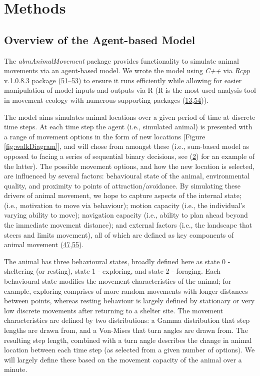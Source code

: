 \documentclass[10pt,a4paper]{article}
\begin{document}
\hypertarget{methods}{%
\section{Methods}\label{methods}}

\hypertarget{overview-of-the-agent-based-model}{%
\subsection{Overview of the Agent-based Model}\label{overview-of-the-agent-based-model}}

The \emph{abmAnimalMovement} package provides functionality to simulate animal movements via an agent-based model.
We wrote the model using \emph{C++} via \emph{Rcpp} v.1.0.8.3 package (\protect\hyperlink{ref-Eddelbuettel_seamless_2011}{51}--\protect\hyperlink{ref-Eddelbuettel_extending_2018}{53}) to ensure it runs efficiently while allowing for easier manipulation of model inputs and outputs via R (R is the most used analysis tool in movement ecology with numerous supporting packages (\protect\hyperlink{ref-joo_recent_2022}{13},\protect\hyperlink{ref-joo_navigating_2020}{54})).

The model aims simulates animal locations over a given period of time at discrete time steps.
At each time step the agent (i.e., simulated animal) is presented with a range of movement options in the form of new locations {[}Figure \ref{fig:walkDiagram}{]}, and will chose from amongst these (i.e., sum-based model as opposed to facing a series of sequential binary decisions, see (\protect\hyperlink{ref-sridhar_geometry_2021}{2}) for an example of the latter).
The possible movement options, and how the new location is selected, are influenced by several factors: behavioural state of the animal, environmental quality, and proximity to points of attraction/avoidance.
By simulating these drivers of animal movement, we hope to capture aspects of the internal state; (i.e., motivation to move via behaviour); motion capacity (i.e., the individual's varying ability to move); navigation capacity (i.e., ability to plan ahead beyond the immediate movement distance); and external factors (i.e., the landscape that steers and limits movement), all of which are defined as key components of animal movement (\protect\hyperlink{ref-Tang2010}{47},\protect\hyperlink{ref-Nathan2008}{55}).

The animal has three behavioural states, broadly defined here as state 0 - sheltering (or resting), state 1 - exploring, and state 2 - foraging.
Each behavioural state modifies the movement characteristics of the animal; for example, exploring comprises of more random movements with longer distances between points, whereas resting behaviour is largely defined by stationary or very low discrete movements after returning to a shelter site.
The movement characteristics are defined by two distributions: a Gamma distribution that step lengths are drawn from, and a Von-Mises that turn angles are drawn from.
The resulting step length, combined with a turn angle describes the change in animal location between each time step (as selected from a given number of options).
We will largely define these based on the movement capacity of the animal over a minute.
\end{document}
